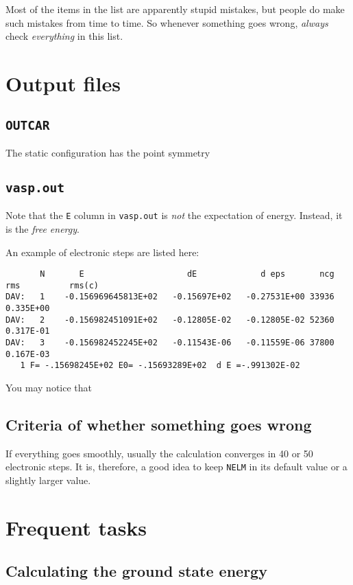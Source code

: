 \documentclass[hyperref, a4paper]{article}
\begin{document}
Most of the items in the list are apparently stupid mistakes, but people do make such mistakes from time to time.
So whenever something goes wrong, \emph{always} check \emph{everything} in this list.

\section{Output files}

\subsection{\texttt{OUTCAR}}

The static configuration has the point symmetry

\subsection{\texttt{vasp.out}}

Note that the \texttt{E} column in \texttt{vasp.out} is \emph{not} the expectation of energy.
Instead, it is the \emph{free energy}.

An example of electronic steps are listed here:
\begin{verbatim}
       N       E                     dE             d eps       ncg     rms          rms(c)
DAV:   1    -0.156969645813E+02   -0.15697E+02   -0.27531E+00 33936   0.335E+00
DAV:   2    -0.156982451091E+02   -0.12805E-02   -0.12805E-02 52360   0.317E-01
DAV:   3    -0.156982452245E+02   -0.11543E-06   -0.11559E-06 37800   0.167E-03
   1 F= -.15698245E+02 E0= -.15693289E+02  d E =-.991302E-02
\end{verbatim}
You may notice that 

\subsection{Criteria of whether something goes wrong}\label{sec:outfile-bugs}

If everything goes smoothly, usually the calculation converges in 40 or 50 electronic steps.
It is, therefore, a good idea to keep \texttt{NELM} in its default value or a slightly larger value.

\section{Frequent tasks}

\subsection{Calculating the ground state energy}
\end{document}
